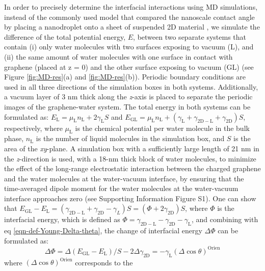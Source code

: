 \documentclass[journal=ancac3,manuscript=article,email=true,hyperref=true,keywords=true]{achemso}
\begin{document}
In order to precisely determine the interfacial interactions using MD
simulations, instead of the commonly used model that compared the
nanoscale contact angle by placing a nanodroplet onto a sheet of
suspended 2D material
\cite{ostrowski_tunable_2014,daub_electrowetting_2007,ren_interfacial_2015,Taherian_2015},
we simulate the difference of the total potential energy, \(E\), between
two separate systems that contain (i) only water molecules with two
surfaces exposing to vacuum (L), and (ii) the same amount of water
molecules with one surface in contact with graphene (placed at z = 0)
and the other surface exposing to vacuum (GL) (see Figure
\ref{fig:MD-res}(a) and \ref{fig:MD-res}(b)). Periodic boundary
conditions are used in all three directions of the simulation boxes in
both systems. Additionally, a vacuum layer of 3 nm thick along the
\emph{z}-axis is placed to separate the periodic images of the
graphene-water system. The total energy in both systems can be
formulated as: \(E_{\mathrm{L}} = \mu_{\mathrm{L}}n_{\mathrm{L}} +
2\gamma_{\mathrm{L}}S\) and
\(E_{\mathrm{GL}}=\mu_{\mathrm{L}}n_{\mathrm{L}}+(\gamma_{\mathrm{L}} +
\gamma_{\mathrm{2D-L}} + \gamma_{\mathrm{2D}})S\), respectively, where
\(\mu_{\mathrm{L}}\) is the chemical potential per water molecule in the
bulk phase, \(n_{\mathrm{L}}\) is the number of liquid molecules in the
simulation box, and \(S\) is the area of the \emph{xy}-plane.  A simulation
box with a sufficiently large length of 21 nm in the \emph{z}-direction is used,
with a 18-nm thick block of water molecules, to minimize the effect of
the long-range electrostatic interaction between the charged graphene
and the water molecules at the water-vacuum interface, by ensuring
that the time-averaged dipole moment for the water molecules at the
water-vacuum interface approaches zero (see Supporting Information
Figure S1).  One can show that \(E_{\mathrm{GL}} - E_{\mathrm{L}} =
(\gamma_{\mathrm{2D-L}} + \gamma_{\mathrm{2D}} - \gamma_{L})S =
(\Phi + 2 \gamma_{\mathrm{2D}})S\), where \(\Phi\) is the interfacial
energy, which is defined as \(\Phi = \gamma_{\mathrm{2D-L}} -
\gamma_{\mathrm{2D}} - \gamma_{\mathrm{L}}\), and combining with eq
\ref{eqn-def-Young-Delta-theta}, the change of interfacial energy
\(\Delta \Phi\) can be formulated as:
\begin{equation}
\label{eqn-Delta-Phi-Delta-cos}
\Delta \Phi = \Delta (E_{\mathrm{GL}} - E_{\mathrm{L}})/S - 2\Delta \gamma_{\mathrm{2D}} = -\gamma_{\mathrm{L}} (\Delta \cos \theta)^{\mathrm{Orien}}
\end{equation}
where \((\Delta\cos \theta)^{\mathrm{Orien}}\) corresponds to the
\end{document}
